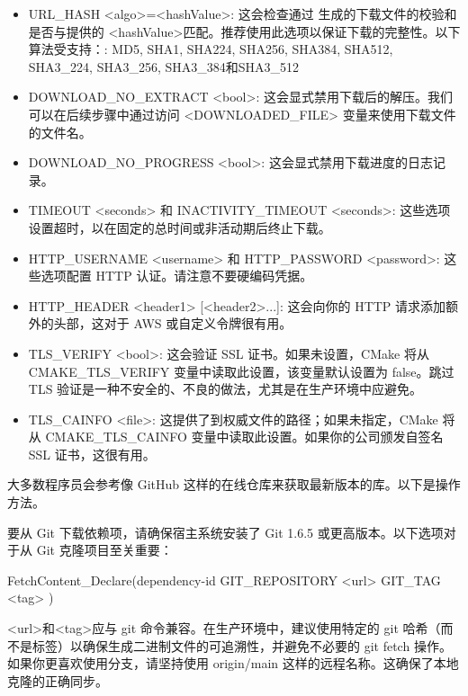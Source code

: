 \begin{itemize}
\item
URL\_HASH <algo>=<hashValue>: 这会检查通过 生成的下载文件的校验和是否与提供的 <hashValue>匹配。推荐使用此选项以保证下载的完整性。以下算法受支持：: MD5, SHA1, SHA224, SHA256, SHA384, SHA512, SHA3\_224, SHA3\_256, SHA3\_384和SHA3\_512

\item
DOWNLOAD\_NO\_EXTRACT <bool>: 这会显式禁用下载后的解压。我们可以在后续步骤中通过访问 <DOWNLOADED\_FILE> 变量来使用下载文件的文件名。

\item
DOWNLOAD\_NO\_PROGRESS <bool>: 这会显式禁用下载进度的日志记录。

\item
TIMEOUT <seconds> 和 INACTIVITY\_TIMEOUT <seconds>: 这些选项设置超时，以在固定的总时间或非活动期后终止下载。

\item
HTTP\_USERNAME <username> 和 HTTP\_PASSWORD <password>: 这些选项配置 HTTP 认证。请注意不要硬编码凭据。

\item
HTTP\_HEADER <header1> [<header2>...]: 这会向你的 HTTP 请求添加额外的头部，这对于 AWS 或自定义令牌很有用。

\item
TLS\_VERIFY <bool>: 这会验证 SSL 证书。如果未设置，CMake 将从 CMAKE\_TLS\_VERIFY 变量中读取此设置，该变量默认设置为 false。跳过 TLS 验证是一种不安全的、不良的做法，尤其是在生产环境中应避免。

\item
TLS\_CAINFO <file>: 这提供了到权威文件的路径；如果未指定，CMake 将从 CMAKE\_TLS\_CAINFO 变量中读取此设置。如果你的公司颁发自签名 SSL 证书，这很有用。
\end{itemize}

大多数程序员会参考像 GitHub 这样的在线仓库来获取最新版本的库。以下是操作方法。


要从 Git 下载依赖项，请确保宿主系统安装了 Git 1.6.5 或更高版本。以下选项对于从 Git 克隆项目至关重要：

\begin{shell}
FetchContent_Declare(dependency-id
                     GIT_REPOSITORY <url>
                     GIT_TAG <tag>
)
\end{shell}

<url>和<tag>应与 git 命令兼容。在生产环境中，建议使用特定的 git 哈希（而不是标签）以确保生成二进制文件的可追溯性，并避免不必要的 git fetch 操作。如果你更喜欢使用分支，请坚持使用 origin/main 这样的远程名称。这确保了本地克隆的正确同步。


